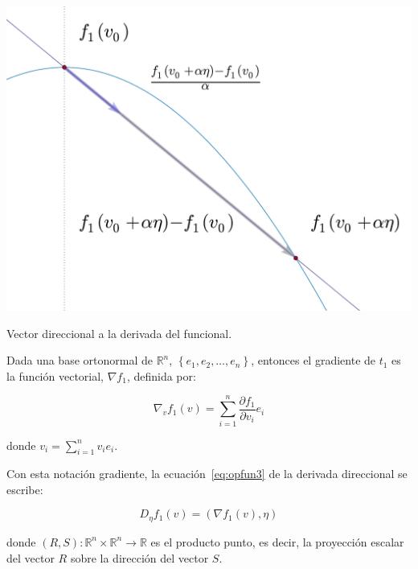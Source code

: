                 \begin{marginfigure}
                    \centering
                    \includegraphics[width=\textwidth]{./imagenes/trayectoriaderivada.pdf}
                    \caption{\label{fig:trayderivada}Vector direccional a la derivada del funcional.}
                \end{marginfigure}

                \begin{definicion}
                    Dada una base ortonormal de $\mathbb{R}^n$, $\left\{ e_1, e_2, \dots, e_n \right\}$, entonces el gradiente de $t_1$ es la función vectorial, $\nabla f_1$, definida por:

                    \begin{equation} \label{eq:opfun3}
                        \nabla_v f_1(v) = \sum_{i=1}^n \frac{\partial f_1}{\partial v_i} e_i
                    \end{equation}

                    donde $v_i = \sum_{i=1}^n v_i e_i$.
                \end{definicion}

                Con esta notación gradiente, la ecuación~\ref{eq:opfun3} de la derivada direccional se escribe:

                \begin{equation}
                    D_{\eta} f_1(v) = \left( \nabla f_1(v), \eta \right)
                \end{equation}

                donde $\left( R, S \right): \mathbb{R}^n \times \mathbb{R}^n \to \mathbb{R}$ es el producto punto, es decir, la proyección escalar del vector $R$ sobre la dirección del vector $S$.

